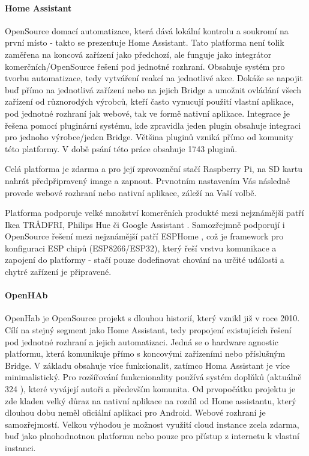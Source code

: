 \paragraph{Home Assistant}
OpenSource domací automatizace, která dává lokální kontrolu a soukromí na první místo - takto se prezentuje Home Assistant. Tato platforma není tolik zaměřena na koncová zařízení jako předchozí, ale funguje jako integrátor komerčních/OpenSource řešení pod jednotné rozhraní. Obsahuje systém pro tvorbu automatizace, tedy vytváření reakcí na jednotlivé akce. Dokáže se napojit buď přímo na jednotlivá zařízení nebo na jejich Bridge a umožnit ovládání všech zařízení od různorodých výrobců, kteří často vynucují použití vlastní aplikace, pod jednotné rozhraní jak webové, tak ve formě nativní aplikace. Integrace je řešena pomocí pluginární systému, kde zpravidla jeden plugin obsahuje integraci pro jednoho výrobce/jeden Bridge. Většina pluginů vzniká přímo od komunity této platformy. V době psání této práce obsahuje 1743 pluginů.\cite{ha}

Celá platforma je zdarma a pro její zprovoznění stačí Raspberry Pi, na SD kartu nahrát předpřipravený image a zapnout. Prvnotním nastavením Vás následně provede webové rozhraní nebo nativní aplikace, záleží na Vaší volbě.\cite{ha-doc}

Platforma podporuje velké množství komerčních produkté mezi nejznámější patří Ikea TRÅDFRI, Philips Hue či Google Assistant \cite{ha-integrations}. Samozřejmně podporují i OpenSource řešení mezi nejznámější patří ESPHome \cite{esphome}, což je framework pro konfiguraci ESP chipů (ESP8266/ESP32), který řeší vrstvu komunikace a zapojení do platformy - stačí pouze dodefinovat chování na určité události a chytré zařízení je připravené.

\paragraph{OpenHAb}
OpenHab je OpenSource projekt s dlouhou historií, který vznikl již v roce 2010. Cílí na stejný segment jako Home Assistant, tedy  propojení existujících řešení pod jednotné rozhraní a jejich automatizaci. Jedná se o hardware agnostic platformu, která komunikuje přímo s koncovými zařízeními nebo příslušným Bridge. V základu obsahuje více funkcionalit, zatímco Homa Assistant je více minimalistický. Pro rozšířování funkcnionality používá systém doplňků (aktuálně 324 \cite{openhab-addons}), které vyvájejí autoři a především komunita. Od prvopočátku projektu je zde kladen velký důraz na nativní aplikace na rozdíl od Home assistantu, který dlouhou dobu neměl oficiální aplikaci pro Android. Webové rozhraní je samozřejmostí. Velkou výhodou je možnost využití cloud instance zcela zdarma, buď jako plnohodnotnou platformu nebo pouze pro přístup z internetu k vlastní instanci.\cite{openhab}

